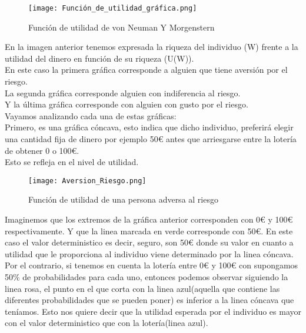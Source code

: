 \documentclass[10pt,a4paper]{book}
\begin{document}
\begin{figure}[htb]
\centering
\texttt{[image: Función\_de\_utilidad\_gráfica.png]}
\caption{Función de utilidad de von Neuman Y Morgenstern}
\end{figure} 



En la imagen anterior tenemos expresada la riqueza del individuo (W) frente a la utilidad del dinero en función de su riqueza (U(W)).\\

En este caso la primera gráfica corresponde a alguien que tiene aversión por el riesgo.\\
La segunda gráfica corresponde alguien con indiferencia al riesgo.\\
Y la última gráfica corresponde con alguien con gusto por el riesgo.\\

Vayamos analizando cada una de estas gráficas:\\

Primero, es una gráfica cóncava, esto indica que dicho individuo, preferirá elegir una cantidad fija de dinero por ejemplo 50€ antes que arriesgarse entre la lotería de obtener 0 o 100€.\\
Esto se refleja en el nivel de utilidad.\\

\begin{figure}[htb]
\centering
\texttt{[image: Aversion\_Riesgo.png]}
\caption{Función de utilidad de una persona adversa al riesgo}
\end{figure} 

Imaginemos que los extremos de la gráfica anterior corresponden con 0€ y 100€ respectivamente. Y que la linea marcada en verde corresponde con 50€. En este caso el valor deterministico es decir, seguro, son 50€ donde su valor en cuanto a utilidad que le proporciona al individuo viene determinado por la linea cóncava. Por el contrario, si tenemos en cuenta la lotería entre 0€ y 100€ con supongamos 50$\%$ de probabilidades para cada uno, entonces podemos observar siguiendo la linea rosa, el punto en el que corta con la linea azul(aquella que contiene las diferentes probabilidades que se pueden poner) es inferior a la linea cóncava que teníamos. Esto nos quiere decir que la utilidad esperada por el individuo es mayor con el valor deterministico que con la lotería(linea azul).\\
\end{document}

